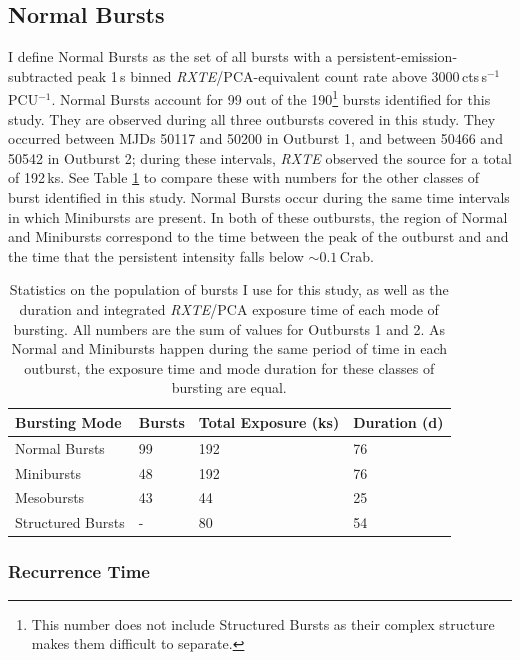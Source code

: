 \subsection{Normal Bursts}

\par I define Normal Bursts as the set of all bursts with a persistent-emission-subtracted peak 1\,s binned \textit{RXTE}/PCA-equivalent count rate above 3000\,cts\,s$^{-1}$\,PCU$^{-1}$.  Normal Bursts account for 99 out of the 190\footnote{This number does not include Structured Bursts as their complex structure makes them difficult to separate.} bursts identified for this study.  They are observed during all three outbursts covered in this study.  They occurred between MJDs 50117 and 50200 in Outburst 1, and between 50466 and 50542 in Outburst 2; during these intervals, \textit{RXTE} observed the source for a total of 192\,ks.  See Table \ref{tab:staretimes} to compare these with numbers for the other classes of burst identified in this study.  Normal Bursts occur during the same time intervals in which Minibursts are present.  In both of these outbursts, the region of Normal and Minibursts correspond to the time between the peak of the outburst and and the time that the persistent intensity falls below $\sim0.1$\,Crab.

\begin{table}
\centering
\begin{tabular}{llll}
\hline
\hline
\scriptsize  Bursting Mode &\scriptsize Bursts &\scriptsize Total Exposure (ks) &\scriptsize Duration (d) \\
\hline
Normal Bursts & 99  & 192 & 76\\
Minibursts & 48 & 192  & 76\\
Mesobursts & 43 &44 &25\\
Structured Bursts & - &80 &54 \\
\hline
\hline
\end{tabular}
\caption[Statistics on the population of Normal Bursts in Outbursts 1 and 2 of the Bursting Pulsar.]{Statistics on the population of bursts I use for this study, as well as the duration and integrated \textit{RXTE}/PCA exposure time of each mode of bursting.  All numbers are the sum of values for Outbursts 1 and 2.  As Normal and Minibursts happen during the same period of time in each outburst, the exposure time and mode duration for these classes of bursting are equal.}
\label{tab:staretimes}
\end{table}

\subsubsection{Recurrence Time}

